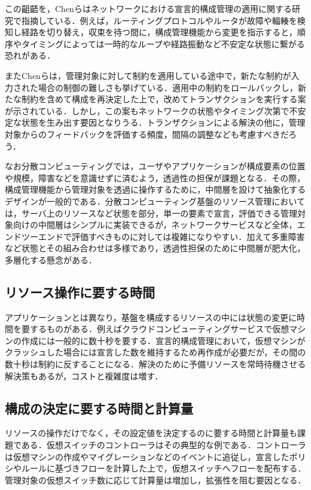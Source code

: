 \documentclass[12pt,a4j]{ujreport}
\begin{document}
この齟齬を，Chenらはネットワークにおける宣言的構成管理の適用に関する研究で指摘している\cite{ref9}．例えば，ルーティングプロトコルやルータが故障や輻輳を検知し経路を切り替え，収束を待つ間に，構成管理機能から変更を指示すると，順序やタイミングによっては一時的なループや経路振動など不安定な状態に繋がる恐れがある．

またChenらは，管理対象に対して制約を適用している途中で，新たな制約が入力された場合の制御の難しさも挙げている．適用中の制約をロールバックし，新たな制約を含めて構成を再決定した上で，改めてトランザクションを実行する案が示されている．しかし，この案もネットワークの状態やタイミング次第で不安定な状態を生み出す要因となりうる．トランザクションによる解決の他に，管理対象からのフィードバックを評価する頻度，間隔の調整なども考慮すべきだろう．

なお分散コンピューティングでは，ユーザやアプリケーションが構成要素の位置や規模，障害などを意識せずに済むよう，透過性の担保が課題となる．その際，構成管理機能から管理対象を透過に操作するために，中間層を設けて抽象化するデザインが一般的である．分散コンピューティング基盤のリソース管理においては，サーバ上のリソースなど状態を部分，単一の要素で宣言，評価できる管理対象向けの中間層はシンプルに実装できるが，ネットワークサービスなど全体，エンドツーエンドで評価すべきものに対しては複雑になりやすい．加えて多重障害など状態とその組み合わせは多様であり，透過性担保のために中間層が肥大化，多層化する懸念がある．

\subsection{リソース操作に要する時間}
アプリケーションとは異なり，基盤を構成するリソースの中には状態の変更に時間を要するものがある．例えばクラウドコンピューティングサービスで仮想マシンの作成には一般的に数十秒を要する\cite{ref13}．宣言的構成管理において，仮想マシンがクラッシュした場合には宣言した数を維持するため再作成が必要だが，その間の数十秒は制約に反することになる．解決のために予備リソースを常時待機させる解決策もあるが，コストと複雑度は増す．

\subsection{構成の決定に要する時間と計算量}
リソースの操作だけでなく，その設定値を決定するのに要する時間と計算量も課題である．仮想スイッチのコントローラはその典型的な例である．コントローラは仮想マシンの作成やマイグレーションなどのイベントに追従し，宣言したポリシやルールに基づきフローを計算した上で，仮想スイッチへフローを配布する．管理対象の仮想スイッチ数に応じて計算量は増加し，拡張性を阻む要因となる．
\end{document}
